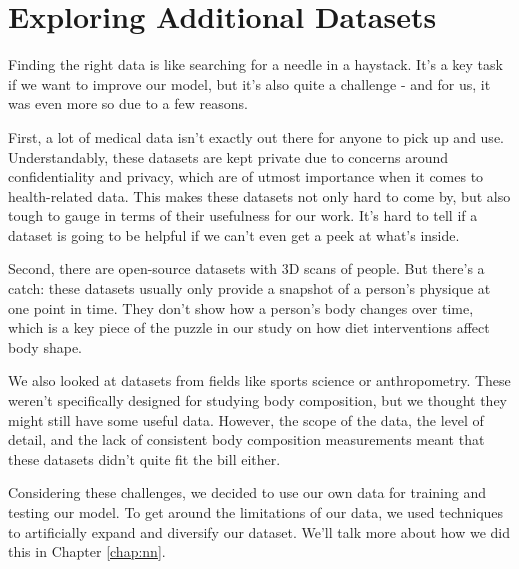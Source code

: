 \section{Exploring Additional Datasets}

Finding the right data is like searching for a needle in a haystack. It's a key
task if we want to improve our model, but it's also quite a challenge - and for
us, it was even more so due to a few reasons.

First, a lot of medical data isn't exactly out there for anyone to pick up and
use. Understandably, these datasets are kept private due to concerns around
confidentiality and privacy, which are of utmost importance when it comes to
health-related data. This makes these datasets not only hard to come by, but
also tough to gauge in terms of their usefulness for our work. It's hard to
tell if a dataset is going to be helpful if we can't even get a peek at what's
inside.

Second, there are open-source datasets with 3D scans of people. But there's a
catch: these datasets usually only provide a snapshot of a person's physique at
one point in time. They don't show how a person's body changes over time, which
is a key piece of the puzzle in our study on how diet interventions affect body
shape.

We also looked at datasets from fields like sports science or anthropometry.
These weren't specifically designed for studying body composition, but we
thought they might still have some useful data. However, the scope of the data,
the level of detail, and the lack of consistent body composition measurements
meant that these datasets didn't quite fit the bill either.

Considering these challenges, we decided to use our own data for training and
testing our model. To get around the limitations of our data, we used
techniques to artificially expand and diversify our dataset. We'll talk more
about how we did this in Chapter \ref{chap:nn}.